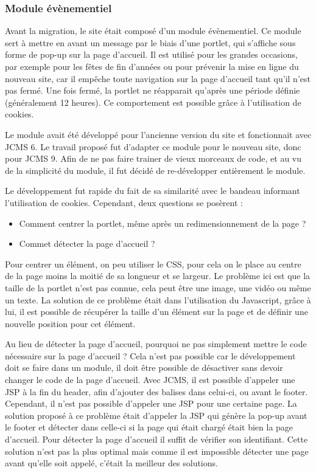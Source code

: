 \documentclass[12pt,a4paper]{article}
\begin{document}
\subsubsection{Module évènementiel}
Avant la migration, le site était composé d'un module évènementiel. Ce module sert à mettre en avant un message par le biais d'une portlet, qui s'affiche sous forme de pop-up sur la page d'accueil. Il est utilisé pour les grandes occasions, par exemple pour les fêtes de fin d'années ou pour prévenir la mise en ligne du nouveau site, car il empêche toute navigation sur la page d'accueil tant qu'il n'est pas fermé. Une fois fermé, la portlet ne réapparait qu'après une période définie (généralement 12 heures). Ce comportement est possible grâce à l'utilisation de cookies.\par 
Le module avait été développé pour l'ancienne version du site et fonctionnait avec \gls{JCMS} 6. Le travail proposé fut d'adapter ce module pour le nouveau site, donc pour \gls{JCMS} 9. Afin de ne pas faire trainer de vieux morceaux de code, et au vu de la simplicité du module, il fut décidé de re-développer entièrement le module.\par 
Le développement fut rapide du fait de sa similarité avec le bandeau informant l'utilisation de cookies. Cependant, deux questions se posèrent : 
\begin{itemize}
\item Comment centrer la portlet, même après un redimensionnement de la page ?
\item Commet détecter la page d'accueil ?
\end{itemize}\par
Pour centrer un élément, on peu utiliser le CSS, pour cela on le place au centre de la page moins la moitié de sa longueur et se largeur. Le problème ici est que la taille de la portlet n'est pas connue, cela peut être une image, une vidéo ou même un texte. La solution de ce problème était dans l'utilisation du Javascript, grâce à lui, il est possible de récupérer la taille d'un élément sur la page et de définir une nouvelle position pour cet élément.\par 
Au lieu de détecter la page d'accueil, pourquoi ne pas simplement mettre le code nécessaire sur la page d'accueil ? Cela n'est pas possible car le développement doit se faire dans un module, il doit être possible de désactiver sans devoir changer le code de la page d'accueil. Avec \gls{JCMS}, il est possible d'appeler une JSP à la fin du header, afin d'ajouter des balises dans celui-ci, ou avant le footer. Cependant, il n'est pas possible d'appeler une JSP pour une certaine page. La solution proposé à ce problème était d'appeler la JSP qui génère la pop-up avant le footer et détecter dans celle-ci si la page qui était chargé était bien la page d'accueil. Pour détecter la page d'accueil il suffit de vérifier son identifiant. Cette solution n'est pas la plus optimal mais comme il est impossible détecter une page avant qu'elle soit appelé, c'était la meilleur des solutions.\par 
\end{document}
